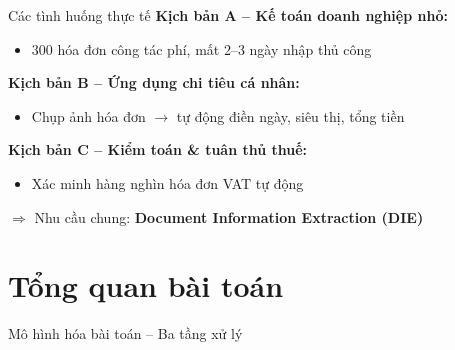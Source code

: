 \documentclass[aspectratio=169]{beamer}
\begin{document}
\begin{frame}{Các tình huống thực tế}
    \textbf{Kịch bản A -- Kế toán doanh nghiệp nhỏ:}
    \begin{itemize}
        \item 300 hóa đơn công tác phí, mất 2--3 ngày nhập thủ công
    \end{itemize}
    \vspace{0.3cm}
    \textbf{Kịch bản B -- Ứng dụng chi tiêu cá nhân:}
    \begin{itemize}
        \item Chụp ảnh hóa đơn $\rightarrow$ tự động điền ngày, siêu thị, tổng tiền
    \end{itemize}
    \vspace{0.3cm}
    \textbf{Kịch bản C -- Kiểm toán \& tuân thủ thuế:}
    \begin{itemize}
        \item Xác minh hàng nghìn hóa đơn VAT tự động
    \end{itemize}
    \vspace{0.3cm}
    $\Rightarrow$ Nhu cầu chung: \textbf{Document Information Extraction (DIE)}
\end{frame}

\section{Tổng quan bài toán}

\begin{frame}{Mô hình hóa bài toán -- Ba tầng xử lý}
    \begin{center}
    \end{center}
\end{frame}
\end{document}
